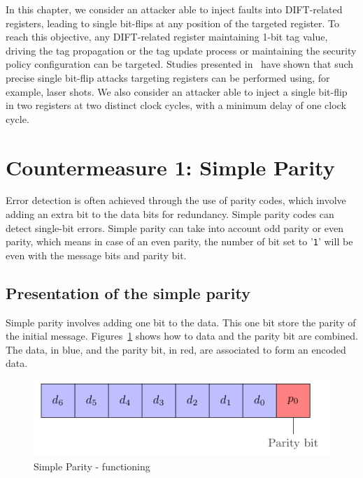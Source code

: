 In this chapter, we consider an attacker able to inject faults into DIFT-related registers, leading to single bit-flips at any position of the targeted register. To reach this objective, any DIFT-related register maintaining 1-bit tag value, driving the tag propagation or the tag update process or maintaining the security policy configuration can be targeted. Studies presented in~\cite{ZDCRT-12-dcis,CLFT-14-cosade} have shown that such precise single bit-flip attacks targeting registers can be performed using, for example, laser shots. We also consider an attacker able to inject a single bit-flip in two registers at two distinct clock cycles, with a minimum delay of one clock cycle.

\section{Countermeasure 1: Simple Parity}
\label{chapter:simpleparity}

Error detection is often achieved through the use of parity codes, which involve adding an extra bit to the data bits for redundancy. Simple parity codes can detect single-bit errors. Simple parity can take into account odd parity or even parity, which means in case of an even parity, the number of bit set to '\texttt{1}' will be even with the message bits and parity bit.

\subsection{Presentation of the simple parity}
Simple parity involves adding one bit to the data. This one bit store the parity of the initial message. Figures~\ref{fig:simpleparity_functionning} shows how to data and the parity bit are combined. The data, in blue, and the parity bit, in red, are associated to form an encoded data.

\begin{figure}[ht]
    \centering
    \includegraphics[page=1]{c5_countermeasures_dift/img/simple_parity.pdf}
    \caption{Simple Parity - functioning}
    \label{fig:simpleparity_functionning}
\end{figure}

